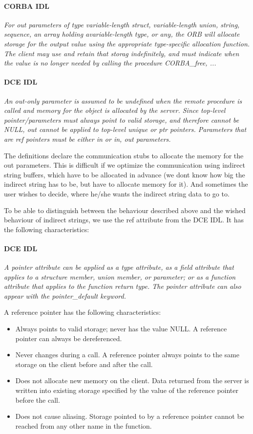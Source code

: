 \paragraph{CORBA IDL}
{\em For out parameters of type variable-length struct,
variable-length union, string, sequence, an array holding
avariable-length type, or any, the ORB will allocate storage for the
output value using the appropriate type-specific allocation
function. The client may use and retain that storag indefinitely, and
must indicate when the value is no longer needed by calling the
procedure CORBA_free, ...}

\paragraph{DCE IDL}
{\em An out-only parameter is assumed to be undefined when the remote
procedure is called and memory for the object is allocated by the
server. Since top-level pointer/parameters must always point to valid
storage, and therefore cannot be NULL, out cannot be applied to
top-level unique or ptr pointers. Parameters that are ref pointers
must be either in or in, out parameters.}

The definitions declare the communication stubs to allocate the memory
for the out parameters. This is difficult if we optimize the
communication using indirect string buffers, which have to be
allocated in advance (we dont know how big the indirect string has to
be, but have to allocate memory for it). And sometimes the user wishes
to decide, where he/she wants the indirect string data to go to.

To be able to distinguish between the behaviour described above and
the wished behaviour of indirect strings, we use the ref attribute
from the DCE IDL. It has the following characteristics:

\paragraph{DCE IDL}
{\em A pointer attribute can be applied as a type attribute, as a
field attribute that applies to a structure member, union member, or
parameter; or as a function attribute that applies to the function
return type. The pointer attribute can also appear with the
pointer_default keyword.}

A reference pointer has the following characteristics:

\begin{itemize}
\item 
	Always points to valid storage; never has the value NULL. A
	reference pointer can always be dereferenced.
\item 
	Never changes during a call. A reference pointer always points
	to the same storage on the client before and after the call.
\item 
	Does not allocate new memory on the client. Data returned from
	the server is written into existing storage specified by the
	value of the reference pointer before the call.
\item 
	Does not cause aliasing. Storage pointed to by a reference
	pointer cannot be reached from any other name in the function.
\end{itemize}

